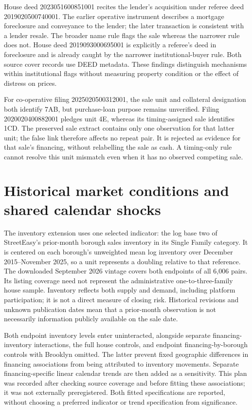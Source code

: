 \documentclass[12pt]{article}
\begin{document}
House deed 2023051600851001 recites the lender's acquisition under referee deed 2019020500740001. The earlier operative instrument describes a mortgage foreclosure and conveyance to the lender; the later transaction is consistent with a lender resale. The broader name rule flags the sale whereas the narrower rule does not. House deed 2019093000695001 is explicitly a referee's deed in foreclosure and is already caught by the narrower institutional-buyer rule. Both source cover records use DEED metadata. These findings distinguish mechanisms within institutional flags without measuring property condition or the effect of distress on prices.

For co-operative filing 2025020500312001, the sale unit and collateral designation both identify 7AB, but purchase-loan purpose remains unverified. Filing 2020020400882001 pledges unit 4E, whereas its timing-assigned sale identifies 1CD. The preserved sale extract contains only one observation for that latter unit; the false link therefore affects no repeat pair. It is rejected as evidence for that sale's financing, without relabelling the sale as cash. A timing-only rule cannot resolve this unit mismatch even when it has no observed competing sale.

\section{Historical market conditions and shared calendar shocks}\label{sec:marketconditions}
The inventory extension uses one selected indicator: the log base two of StreetEasy's prior-month borough sales inventory in its Single Family category. It is centered on each borough's unweighted mean log inventory over December 2015--November 2025, so a unit represents a doubling relative to that reference. The downloaded September 2026 vintage covers both endpoints of all 6,006 pairs. Its listing coverage need not represent the administrative one-to-three-family house sample. Inventory reflects both supply and demand, including platform participation; it is not a direct measure of closing risk. Historical revisions and unknown publication dates mean that a prior-month observation is not necessarily information publicly available on the sale date.

Both endpoint inventory levels enter uninteracted, alongside separate financing-inventory interactions, the full house controls, and endpoint financing-by-borough controls with Brooklyn omitted. The latter prevent fixed geographic differences in financing associations from being attributed to inventory movements. Separate financing-specific linear calendar trends are then added as a sensitivity. This plan was recorded after checking source coverage and before fitting these associations; it was not externally preregistered. Both fitted specifications are reported, without choosing a preferred indicator or trend specification from significance.
\end{document}
